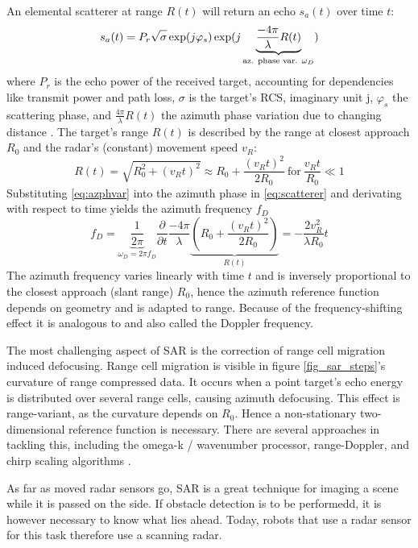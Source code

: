 An elemental scatterer at range \(R(t)\) will return an echo \(s_a(t)\)
over time \(t\): 
\begin{equation} \label{eq:scatterer}
	s_a(t) = P_r \sqrt{\sigma\vphantom{1}} \exp(j\varphi_s)\exp(j \underbrace{\frac{-4\pi}{\lambda}R(t)}_\text{az. phase var. $\omega_D$})
\end{equation}
where \(P_r\) is the echo power of the received target, accounting
for dependencies like transmit power and path loss, \(\sigma\) is the
target's RCS, imaginary unit \si{j}, \(\varphi_s\) the scattering phase,
and \(\frac{4\pi}{\lambda}R(t)\) the azimuth phase variation due to
changing distance \cite{Cumming2004}. The target's range \(R(t)\) is
described by the range at closest approach \(R_0\) and the radar's
(constant) movement speed \(v_R\): 
\begin{equation} \label{eq:azphvar}
	R(t) = \sqrt{R_0^2+\left(v_Rt\right)^2} \approx R_0 + \frac{(v_Rt)^2}{2R_0} ~\text{for}~ \frac{v_Rt}{R_0} \ll 1
\end{equation}
Substituting \cref{eq:azphvar} into the azimuth phase in \cref{eq:scatterer} and derivating
with respect to time yields the azimuth frequency \(f_D\) 
\begin{equation}
	f_D = \underbrace{\frac{1}{2\pi}}_{\omega_D = 2\pi f_D} \frac{\partial}{\partial t} \frac{-4\pi}{\lambda}  \underbrace{\left( R_0 + \frac{(v_Rt)^2}{2R_0}  \right)}_{R(t)} = -\frac{2v_R^2}{\lambda R_0}t
\end{equation}
The azimuth frequency varies linearly with time \(t\) and is
inversely proportional to the closest approach (slant range) \(R_0\),
hence the azimuth reference function depends on geometry and is adapted
to range. Because of the frequency-shifting effect it is analogous to
and also called the Doppler frequency.

The most challenging aspect of SAR is the correction of range cell
migration induced defocusing. Range cell migration is visible in figure
\cref{fig_sar_steps}'s curvature of range compressed data. It occurs when a point
target's echo energy is distributed over several range cells, causing
azimuth defocusing. This effect is range-variant, as the curvature
depends on \(R_0\). Hence a non-stationary two-dimensional reference
function is necessary. There are several approaches in tackling this,
including the omega-k / wavenumber processor, range-Doppler, and chirp
scaling algorithms \cite{Moreira2013}.

As far as moved radar sensors go, SAR is a great technique for imaging a scene while it is passed on the side. If obstacle detection is to be performedd, it is however necessary to know what lies ahead. Today, robots that use a radar sensor for this task therefore use a scanning radar.


